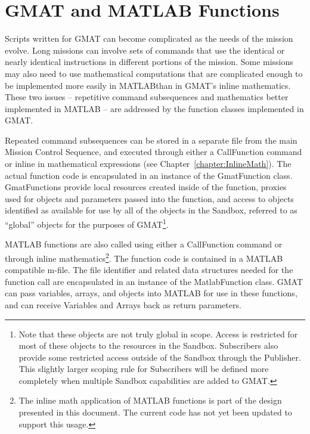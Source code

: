 \chapter{\label{chapter:Functions}GMAT and MATLAB Functions}

Scripts written for GMAT can become complicated as the needs of the mission evolve.  Long missions
can involve sets of commands that use the identical or nearly identical instructions in different
portions of the mission.  Some missions may also need to use mathematical computations that are
complicated enough to be implemented more easily in MATLAB\textregistered than in GMAT's inline
mathematics. These two issues -- repetitive command subsequences and mathematics better implemented
in MATLAB -- are addressed by the function classes implemented in GMAT.

Repeated command subsequences can be stored in a separate file from the main Mission Control
Sequence, and executed through either a CallFunction command or inline in mathematical expressions
(see Chapter~\ref{chapter:InlineMath}).  The actual function code is encapsulated in an instance of
the GmatFunction class.  GmatFunctions provide local resources created inside of the
function, proxies used for objects and parameters passed into the function, and access to objects
identified as available for use by all of the objects in the Sandbox, referred to as ``global''
objects for the purposes of GMAT\footnote{Note that these objects are not truly global in scope. 
Access is restricted for most of these objects to the resources in the Sandbox.  Subscribers also
provide some restricted access outside of the Sandbox through the Publisher.  This slightly larger
scoping rule for Subscribers will be defined more completely when multiple Sandbox capabilities are
added to GMAT.}.

MATLAB functions are also called using either a CallFunction command or through inline
mathematics\footnote{The inline math application of MATLAB functions is part of the design
presented in this document.  The current code has not yet been updated to support this usage.}. The
function code is contained in a MATLAB compatible m-file.  The file identifier and related data
structures needed for the function call are encapsulated in an instance of the MatlabFunction class.
 GMAT can pass variables, arrays, and objects into MATLAB for use in these functions, and can
receive Variables and Arrays back as return parameters.

